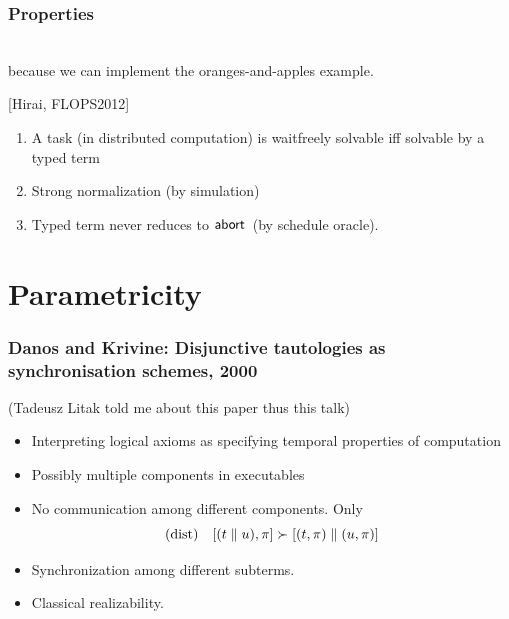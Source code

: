 \documentclass[slidestop,compress,mathserif]{beamer}
\newcommand{\ej}[2]{#1} %
\begin{document}
  \begin{frame}
   \frametitle{Properties}

   \\
   because we can implement the oranges-and-apples example.

   \vfill
    [Hirai, FLOPS2012]
  \begin{enumerate}
   \item   \ej{A task (in distributed computation) is}{分散計算のタスクは}
  \ej{waitfreely solvable}{waitfree(待ち合わせ無し)に解ける}
 \ej{iff}
 {ときに限って}
  \ej{solvable by a typed \lgd term}
     {ゲーデル・ダメット論理の\\
      型付きラムダ計算で解ける}
   \item Strong normalization (by simulation)
   \item Typed term never reduces to $\mathsf{abort\,}$ (by schedule oracle).
  \end{enumerate}
  \end{frame}


  \section{Parametricity}
\frame{\tableofcontents[currentsection]}
  \begin{frame}
   \frametitle{Danos and Krivine: Disjunctive tautologies as synchronisation schemes, 2000}

   (Tadeusz Litak told me about this paper thus this talk)
   \vfill

   \begin{itemize}
    \item Interpreting logical axioms as specifying temporal properties
	  of computation
    \item Possibly multiple components in executables
   \end{itemize}

   \vfill
   \begin{itemize}
    \item No communication among different components.  Only
	     \[
	     \text{(dist)}\quad [(t\parallel u),\pi]  \succ [(t,\pi)\parallel (u,\pi)]
	     \]
    \item Synchronization among different subterms.
    \item Classical realizability.
   \end{itemize}

   \vfill
  \end{frame}
\end{document}
